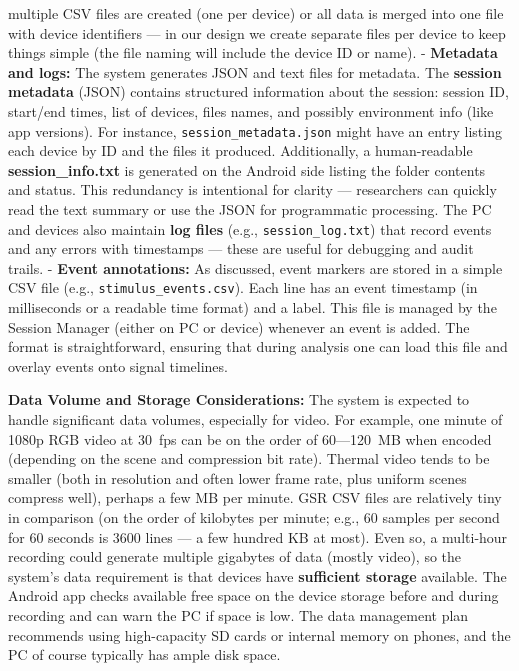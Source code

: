 \documentclass[11pt,a4paper]{report}
\begin{document}
multiple CSV files are created (one per device) or all data is merged
into one file with device identifiers --- in our design we create
separate files per device to keep things simple (the file naming will
include the device ID or name). - \textbf{Metadata and logs:} The system
generates JSON and text files for metadata. The \textbf{session metadata}
(JSON) contains structured information about the session: session ID,
start/end times, list of devices, files names, and possibly environment
info (like app versions). For instance, \texttt{session\_metadata.json} might
have an entry listing each device by ID and the files it
produced.
Additionally, a human-readable \textbf{session\_info.txt} is generated on the
Android side listing the folder contents and
status\cite{Fowles1981}.
This redundancy is intentional for clarity --- researchers can quickly
read the text summary or use the JSON for programmatic processing. The
PC and devices also maintain \textbf{log files} (e.g., \texttt{session\_log.txt})
that record events and any errors with timestamps --- these are useful
for debugging and audit trails. - \textbf{Event annotations:} As discussed,
event markers are stored in a simple CSV file (e.g.,
\texttt{stimulus\_events.csv}). Each line has an event timestamp (in
milliseconds or a readable time format) and a label. This file is
managed by the Session Manager (either on PC or device) whenever an
event is
added\cite{ContactlessStressThermal2022}.
The format is straightforward, ensuring that during analysis one can
load this file and overlay events onto signal timelines.

\textbf{Data Volume and Storage Considerations:} The system is expected to
handle significant data volumes, especially for video. For example, one
minute of 1080p RGB video at 30 fps can be on the order of 60---120 MB
when encoded (depending on the scene and compression bit rate). Thermal
video tends to be smaller (both in resolution and often lower frame
rate, plus uniform scenes compress well), perhaps a few MB per minute.
GSR CSV files are relatively tiny in comparison (on the order of
kilobytes per minute; e.g., 60 samples per second for 60 seconds is 3600
lines --- a few hundred KB at most). Even so, a multi-hour recording
could generate multiple gigabytes of data (mostly video), so the
system's data requirement is that devices have \textbf{sufficient storage}
available. The Android app checks available free space on the device
storage before and during
recording
and can warn the PC if space is low. The data management plan recommends
using high-capacity SD cards or internal memory on phones, and the PC of
course typically has ample disk space.
\end{document}
